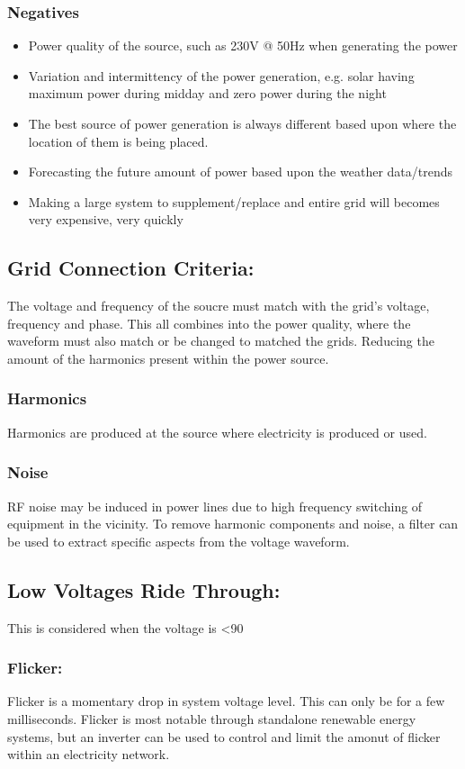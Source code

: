 \documentclass[a5paper]{report}
\begin{document}
	\subsubsection*{Negatives}
	\begin{itemize}
		\item Power quality of the source, such as 230V @ 50Hz when generating the power
		\item Variation and intermittency of the power generation, e.g. solar having maximum power during midday and zero power during the night
		\item The best source of power generation is always different based upon where the location of them is being placed.
		\item Forecasting the future amount of power based upon the weather data/trends
		\item Making a large system to supplement/replace and entire grid will becomes very expensive, very quickly
	\end{itemize}

	\subsection*{Grid Connection Criteria:}
	The voltage and frequency of the soucre must match with the grid's voltage, frequency and phase. This all combines into the power quality, where the waveform must also match or be changed to matched the grids. Reducing the amount of the harmonics present within the power source.
	\subsubsection*{Harmonics}
	Harmonics are produced at the source where electricity is produced or used.
	\subsubsection*{Noise}
	RF noise may be induced in power lines due to high frequency switching of equipment in the vicinity. To remove harmonic components and noise, a filter can be used to extract specific aspects from the voltage waveform.

	\subsection*{Low Voltages Ride Through:}
	This is considered when the voltage is <90%

	\subsubsection*{Flicker:}
	Flicker is a momentary drop in system voltage level. This can only be for a few milliseconds. Flicker is most notable through standalone renewable energy systems, but an inverter can be used to control and limit the amonut of flicker within an electricity network.
\end{document}
